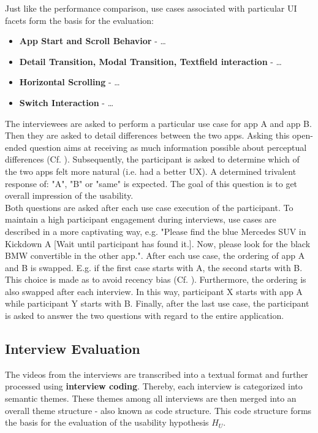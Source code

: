 Just like the performance comparison, use cases associated with particular UI facets form the basis for the evaluation:
\begin{itemize}
    \item \textbf{App Start and Scroll Behavior} - \dots
    \item \textbf{Detail Transition, Modal Transition, Textfield interaction} - \dots
    \item \textbf{Horizontal Scrolling} - \dots
    \item \textbf{Switch Interaction} - \dots
\end{itemize}
The interviewees are asked to perform a particular use case for app A and app B. Then they are asked to detail differences between the two apps.
Asking this open-ended question aims at receiving as much information possible about perceptual differences (Cf. \cite[182--185]{Helferrich2011}).
Subsequently, the participant is asked to determine which of the two apps felt more natural (i.e. had a better UX). A determined trivalent response of: "A", "B" or "same" is expected. 
The goal of this question is to get overall impression of the usability. \\
Both questions are asked after each use case execution of the participant. 
To maintain a high participant engagement during interviews, use cases are described in a more captivating way, e.g. "Please find the blue Mercedes SUV in Kickdown A [Wait until participant has found it.]. Now, 
please look for the black BMW convertible in the other app.". 
After each use case, the ordering of app A and B is swapped. E.g. if the first case starts with A, the second starts with B. This choice is made as to avoid recency bias (Cf. \cite{Atkinson1968}).
Furthermore, the ordering is also swapped after each interview. In this way, participant X starts with app A while participant Y starts with B.
Finally, after the last use case, the participant is asked to answer the two questions with regard to the entire application.


\subsection{Interview Evaluation}
The videos from the interviews are transcribed into a textual format and further processed using \textbf{interview coding}. Thereby, each interview is categorized into semantic themes. These themes among
all interviews are then merged into an overall theme structure - also known as code structure. This code structure forms the basis for the evaluation of the usability hypothesis $H_U$. 
